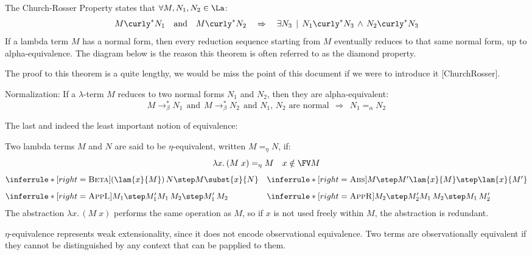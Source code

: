 \begin{theorem} The Church-Rosser Property states that $\forall M, N_1, N_2 \in \La$:
  \[
    M \curly^* N_1 \quad \text{and} \quad M \curly^* N_2 \quad \Rightarrow \quad \exists N_3 \, \mid \, N_1 \curly^* N_3 \,\wedge\, N_2 \curly^* N_3
  \]
  If a lambda term $M$ has a normal form, then every reduction sequence starting from $M$ eventually reduces to that same normal form, up to alpha-equivalence. The diagram below is the reason this theorem is often referred to as the diamond property.
\begin{center}
\end{center}
The proof to this theorem is a quite lengthy, we would be miss the point
of this document if we were to introduce it [ChurchRosser].
\end{theorem}
\begin{corollary} Normalization: If a $\lambda$-term $M$ reduces to two normal forms $N_1$ and $N_2$, then they are alpha-equivalent:
\[
M \to_\beta^* N_1 \ \ \text{and} \ \ M \to_\beta^* N_2 \ \ \text{and $N_1$, $N_2$ are normal} \ \ \Rightarrow \ \ N_1 =_\alpha N_2
\]
\end{corollary}

The last and indeed the least important notion of equivalence:
\begin{definition} Two lambda terms \( M \) and \( N \) are said to be $\eta$-equivalent, written \( M =_\eta N \), if:
  \[
    \lambda x.\, (M\;x) =_\eta M \quad x \notin \FV M 
  \]
  \[
\begin{array}{@{}l@{\quad}l@{}}
  \inferrule*[right=\textsc{Beta}]
    { }
    { (\lam{x}{M})\,N \step M\subst{x}{N} }
  &
  \inferrule*[right=\textsc{Abs}]
    { M \step M' }
    { \lam{x}{M} \step \lam{x}{M'} } \\[2ex]
  \inferrule*[right=\textsc{AppL}]
    { M_1 \step M_1' }
    { M_1\,M_2 \step M_1'\,M_2 }
  &
  \inferrule*[right=\textsc{AppR}]
    { M_2 \step M_2' }
    { M_1\,M_2 \step M_1\,M_2' }
\end{array}
\]
  The abstraction \( \lambda x.\, (M\;x) \) performs the same operation as \( M \), so if \( x \) is not used freely within \( M \), the abstraction is redundant.
\end{definition}
$\eta$-equivalence represents weak extensionality, since it does not encode observational equivalence. Two terms are observationally equivalent if they cannot be distinguished by any context that can be papplied to them.
